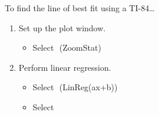 \begin{minipage}[t]{0.5\textwidth}
\begin{myConcept}{To find the line of best fit using a {\scshape TI-84}\dots}
\begin{enumerate}
\begin{itemize}
                    \item To clear columns, move to the header\\ and select 
                \end{itemize}
            \item Set up the plot window.
                \begin{itemize}
                    \item Select 
                        \,\,{\footnotesize\ttfamily (ZoomStat)}
                \end{itemize}
            \item Perform linear regression.
                \begin{itemize}
                    \item Select 
                        \,\,{(\small\ttfamily LinReg(ax+b))}
                    \item Select 
                \end{itemize}
        \end{enumerate}
    \end{myConcept}
    \end{minipage}
    
    